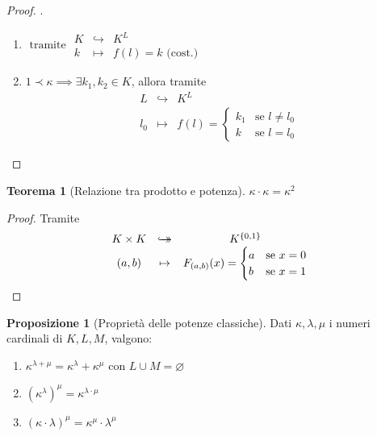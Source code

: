 \documentclass[a4paper,10pt]{article}
\theoremstyle{definition}
\newcommand{\hookdoubleheadrightarrow}{\hookrightarrow\mathrel{\mspace{-15mu}}\rightarrow}
\newcommand{\bij}{\hookdoubleheadrightarrow} %
\theoremstyle{indentdefinition}
\theoremstyle{indentpostulate}
\theoremstyle{indenttheorem}
\newtheorem{thm}{Teorema}[section]
\newtheorem{prop}{Proposizione}[section]
\theoremstyle{myremark}
\theoremstyle{indentgeneral}
\begin{document}
\begin{proof}.
\begin{enumerate}
    \item $\text{ tramite }\begin{array}{ccc}
              K & \hookrightarrow & K^L  \\
              k &\mapsto & f(l)=k \text{ (cost.)}
           \end{array}$
           \item $1\prec\kappa\implies\exists k_1,k_2\in K$, allora tramite $$\begin{array}{ccc}
              L & \hookrightarrow & K^L  \\
              l_0 &\mapsto & f(l)=\begin{cases}
                  k_1 & \text{se }l\ne l_0\\
                  k & \text{se }l=l_0
              \end{cases}
           \end{array}$$
\end{enumerate}
\end{proof}

\begin{thm}[Relazione tra prodotto e potenza]
    $\kappa\cdot\kappa=\kappa^2$
\end{thm}

\begin{proof}
    Tramite
    $$\begin{array}{ccc}
    K\times K & \bij & K^{\{0,1\}}  \\
     (a,b) & \mapsto & F_{(a,b)}(x)=\begin{cases}
         a & \text{se }x=0\\
         b & \text{se }x=1
     \end{cases}
\end{array}$$
\end{proof}


\begin{prop}[Proprietà delle potenze classiche]
    Dati $\kappa,\lambda,\mu$ i numeri cardinali di $K,L,M$, valgono:
    \begin{enumerate}
        \item $\kappa^{\lambda+\mu}=\kappa^\lambda+\kappa^\mu$ con $L\cup M=\varnothing$
        \item $(\kappa^\lambda)^\mu=\kappa^{\lambda\cdot\mu}$
        \item $(\kappa\cdot\lambda)^\mu=\kappa^\mu\cdot\lambda^\mu$
    \end{enumerate}
\end{prop}
\end{document}
